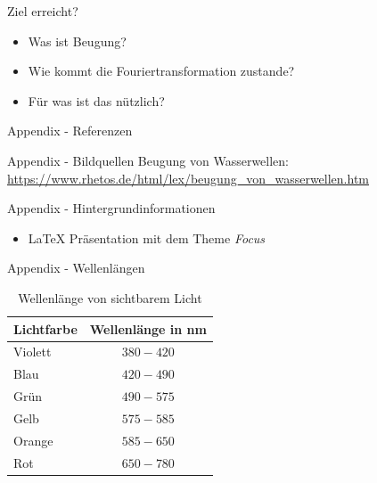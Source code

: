\documentclass{beamer}
\begin{document}
\begin{frame}{Ziel erreicht?}
    \begin{itemize}
        \item Was ist Beugung?
        \item Wie kommt die Fouriertransformation zustande?
        \item Für was ist das nützlich?
    \end{itemize}
\end{frame}


\appendix

\begin{frame}{Appendix - Referenzen}
    \nocite{*} %
    
    
\end{frame}

\begin{frame}{Appendix - Bildquellen}
    Beugung von Wasserwellen: \\
    \url{https://www.rhetos.de/html/lex/beugung_von_wasserwellen.htm}
\end{frame}

\begin{frame}{Appendix - Hintergrundinformationen}
    \begin{itemize}
        \item \LaTeX{} Präsentation mit dem Theme \emph{Focus}
    \end{itemize}

\end{frame}

\begin{frame}{Appendix - Wellenlängen}
    \begin{table}
        \centering %
        \begin{tabular}{l c}
            \toprule
            Lichtfarbe & Wellenlänge in nm \\
            \toprule
            Violett    & $380 - 420$       \\
            Blau       & $420 - 490$       \\
            Grün       & $490 - 575$       \\
            Gelb       & $575 - 585$       \\
            Orange     & $585 - 650$       \\
            Rot        & $650 - 780$       \\
            \bottomrule
        \end{tabular}
        \caption{Wellenlänge von sichtbarem Licht}
    \end{table}
\end{frame}

\end{document}
